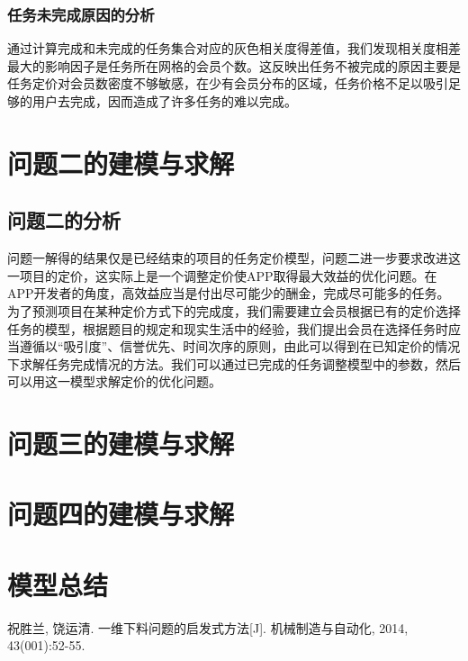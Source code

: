 \documentclass[withoutpreface,bwprint]{cumcmthesis} %
\begin{document}
\subsubsection{任务未完成原因的分析}
通过计算完成和未完成的任务集合对应的灰色相关度得差值，我们发现相关度相差最大的影响因子是任务所在网格的会员个数。这反映出任务不被完成的原因主要是任务定价对会员数密度不够敏感，在少有会员分布的区域，任务价格不足以吸引足够的用户去完成，因而造成了许多任务的难以完成。

\section{问题二的建模与求解}

\subsection{问题二的分析}
问题一解得的结果仅是已经结束的项目的任务定价模型，问题二进一步要求改进这一项目的定价，这实际上是一个调整定价使APP取得最大效益的优化问题。在APP开发者的角度，高效益应当是付出尽可能少的酬金，完成尽可能多的任务。为了预测项目在某种定价方式下的完成度，我们需要建立会员根据已有的定价选择任务的模型，根据题目的规定和现实生活中的经验，我们提出会员在选择任务时应当遵循以“吸引度”、信誉优先、时间次序的原则，由此可以得到在已知定价的情况下求解任务完成情况的方法。我们可以通过已完成的任务调整模型中的参数，然后可以用这一模型求解定价的优化问题。


\section{问题三的建模与求解}

\section{问题四的建模与求解}

\section{模型总结}

\begin{thebibliography}{9}%
    祝胜兰, 饶运清. 一维下料问题的启发式方法[J]. 机械制造与自动化, 2014, 43(001):52-55.
\end{thebibliography}

\begin{appendices}
\end{appendices}
\end{document}
